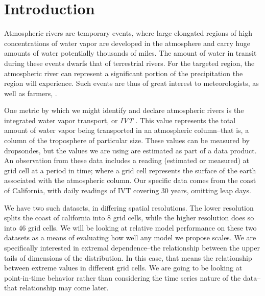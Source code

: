 
\section{Introduction}
Atmospheric rivers are temporary events, where large elongated regions of high concentrations of
  water vapor are developed in the atmosphere and carry huge amounts of water potentially thousands
  of miles.  The amount of water in transit during these events dwarfs that of terrestrial rivers.
  For the targeted region, the atmospheric river can represent a significant portion of the
  precipitation the region will experience.  Such events are thus of great interest to meteorologists,
  as well as farmers, .

One metric by which we might identify and declare atmospheric rivers is the integrated water vapor
  transport, or \emph{IVT} .  This value represents the total amount of water
  vapor being transported in an atmospheric column--that is, a column of the troposphere of particular
  size. These values can be measured by dropsondes, but the values we are using are estimated as part
  of a data product.  An observation from these data includes a reading (estimated
  or measured) at grid cell at a period in time; where a grid cell represents the surface of the
  earth associated with the atmospheric column.  Our specific data comes from the coast of California,
  with daily readings of IVT covering 30 years, omitting leap days.

We have two such datasets, in differing spatial resolutions.  The lower resolution splits the coast
  of california into 8 grid cells, while the higher resolution does so into 46 grid cells.
  We will be looking at relative model performance on these two datasets as a means of evaluating
  how well any model we propose scales.  We are specifically interested in extremal dependence--the
  relationship between the upper tails of dimensions of the distribution.  In this case, that means
  the relationship between extreme values in different grid cells.  We are going to be looking at
  point-in-time behavior rather than considering the time series nature of the data--that
  relationship may come later.

